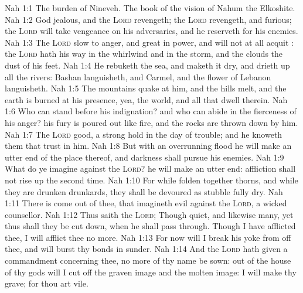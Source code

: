 \vs Nah 1:1 The burden of Nineveh. The book of the vision of Nahum the Elkoshite.
\vs Nah 1:2 God  jealous, and the \textsc{Lord} revengeth; the \textsc{Lord} revengeth, and  furious; the \textsc{Lord} will take vengeance on his adversaries, and he reserveth  for his enemies.
\vs Nah 1:3 The \textsc{Lord}  slow to anger, and great in power, and will not at all acquit : the \textsc{Lord} hath his way in the whirlwind and in the storm, and the clouds  the dust of his feet.
\vs Nah 1:4 He rebuketh the sea, and maketh it dry, and drieth up all the rivers: Bashan languisheth, and Carmel, and the flower of Lebanon languisheth.
\vs Nah 1:5 The mountains quake at him, and the hills melt, and the earth is burned at his presence, yea, the world, and all that dwell therein.
\vs Nah 1:6 Who can stand before his indignation? and who can abide in the fierceness of his anger? his fury is poured out like fire, and the rocks are thrown down by him.
\vs Nah 1:7 The \textsc{Lord}  good, a strong hold in the day of trouble; and he knoweth them that trust in him.
\vs Nah 1:8 But with an overrunning flood he will make an utter end of the place thereof, and darkness shall pursue his enemies.
\vs Nah 1:9 What do ye imagine against the \textsc{Lord}? he will make an utter end: affliction shall not rise up the second time.
\vs Nah 1:10 For while  folden together  thorns, and while they are drunken  drunkards, they shall be devoured as stubble fully dry.
\vs Nah 1:11 There is  come out of thee, that imagineth evil against the \textsc{Lord}, a wicked counsellor.
\vs Nah 1:12 Thus saith the \textsc{Lord}; Though  quiet, and likewise many, yet thus shall they be cut down, when he shall pass through. Though I have afflicted thee, I will afflict thee no more.
\vs Nah 1:13 For now will I break his yoke from off thee, and will burst thy bonds in sunder.
\vs Nah 1:14 And the \textsc{Lord} hath given a commandment concerning thee,  no more of thy name be sown: out of the house of thy gods will I cut off the graven image and the molten image: I will make thy grave; for thou art vile.
